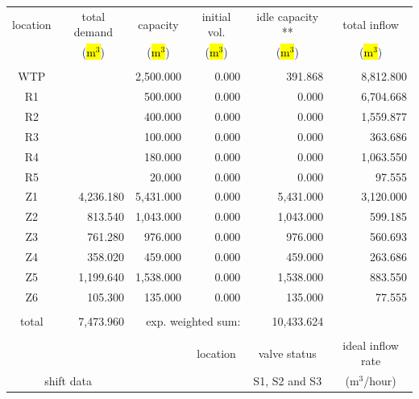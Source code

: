 \documentclass{singlecol}
\theoremstyle{TH}{
\newtheorem{lemma}{Lemma}
\newtheorem{theorem}[lemma]{Theorem}
\newtheorem{corrolary}[lemma]{Corrolary}
\newtheorem{conjecture}[lemma]{Conjecture}
\newtheorem{proposition}[lemma]{Proposition}
\newtheorem{claim}[lemma]{Claim}
\newtheorem{stheorem}[lemma]{Wrong Theorem}
\newtheorem{algorithm}{Algorithm}
}
\theoremstyle{THrm}{
\newtheorem{definition}{Definition}[section]
\newtheorem{question}{Question}[section]
\newtheorem{remark}{Remark}
\newtheorem{scheme}{Scheme}
}
\theoremstyle{THhit}{
\newtheorem{case}{Case}[section]
}
\begin{document}
\begin{table}[h!]
\begin{center}
\begin{small}
	\begin{tabular}{ c r r r r r } 
		location & \multicolumn{1}{c}{total demand}      & \multicolumn{1}{c}{capacity} & \multicolumn{1}{c}{initial vol.} & \multicolumn{1}{c}{idle capacity **} & \multicolumn{1}{c}{total inflow}  \\
		      & \multicolumn{1}{c}{(\hl{$\mathrm{m^3}$})} & \multicolumn{1}{c}{(\hl{$\mathrm{m^3}$})}   & \multicolumn{1}{c}{(\hl{$\mathrm{m^3}$})}     &  \multicolumn{1}{c}{(\hl{$\mathrm{m^3}$})}   &  \multicolumn{1}{c}{(\hl{$\mathrm{m^3}$})}               \\
		\\
		WTP   &            & 2,500.000 & 0.000 &   391.868 & 8,812.800 \\
		R1    &            &   500.000 & 0.000 &     0.000 & 6,704.668 \\
		R2    &            &   400.000 & 0.000 &     0.000 & 1,559.877 \\
		R3    &            &   100.000 & 0.000 &     0.000 &   363.686 \\
	    R4    &            &   180.000 & 0.000 &     0.000 & 1,063.550 \\
	    R5    &            &    20.000 & 0.000 &     0.000 &    97.555 \\
	    Z1    &  4,236.180 & 5,431.000 & 0.000 & 5,431.000 & 3,120.000 \\
	    Z2    &    813.540 & 1,043.000 & 0.000 & 1,043.000 &   599.185 \\
	    Z3    &    761.280 &   976.000 & 0.000 &   976.000 &   560.693 \\
	    Z4    &    358.020 &   459.000 & 0.000 &   459.000 &   263.686 \\
	    Z5    &  1,199.640 & 1,538.000 & 0.000 & 1,538.000 &   883.550 \\
	    Z6    &    105.300 &   135.000 & 0.000 &   135.000 &    77.555 \\
	    \\
	    total & 7,473.960 & \multicolumn{2}{r}{exp. weighted sum:} & 10,433.624 & \\
		   \\
		&  &      &  \multicolumn{1}{c}{location}    & \multicolumn{1}{c}{valve status}         & \multicolumn{1}{c}{ideal inflow rate}   \\
		\multicolumn{2}{c}{shift data}     &   &      & \multicolumn{1}{c}{S1, S2 and S3}        & \multicolumn{1}{c}{($\mathrm{m^3}$/hour)}  \\

\end{tabular}
\end{small}
\end{center}
\end{table}
\end{document}
